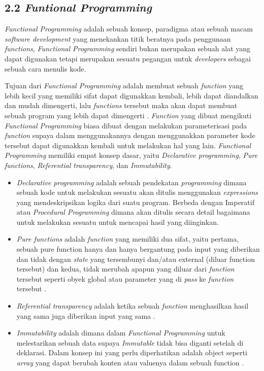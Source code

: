 \documentclass[a4paper]{article}
\begin{document}
    
\newpage
\subsection*{2.2 \textit{Funtional Programming}}
\textit{Functional Programming} adalah sebuah konsep, paradigma atau sebuah macam \textit{software development} yang menekankan titik beratnya pada penggunaan \textit{functions}, \textit{Functional Programming} sendiri bukan merupakan sebuah alat yang dapat digunakan tetapi merupakan sesuatu pegangan untuk \textit{developers} sebagai sebuah cara menulis kode\autocite{atencio2016functional}.


Tujuan dari \textit{Functional Programming} adalah membuat sebuah \textit{function} yang lebih kecil yang memiliki sifat dapat digunakkan kembali, lebih dapat diandalkan dan mudah dimengerti, lalu \textit{functions} tersebut maka akan dapat membuat sebuah program yang lebih dapat dimengerti \autocite{atencio2016functional}. \textit{Function} yang dibuat mengikuti \textit{Functional Programming} biasa dibuat dengan melakukan parameterisasi pada \textit{function} supaya dalam menggunakannya dengan menggunakkan parameter kode tersebut dapat digunakkan kembali untuk melakukan hal yang lain. \textit{Functional Programming} memiliki empat konsep dasar, yaitu \textit{Declarative programming}, \textit{Pure functions}, \textit{Referential transparency}, dan \textit{Immutability}\autocite{atencio2016functional}.


\begin{itemize}
    \item \textit{Declarative programming} adalah sebuah pendekatan \textit{programming} dimana sebuah kode untuk melakukan sesuatu akan ditulis menggunakan \textit{expressions} yang mendeskripsikan logika dari suatu program. Berbeda dengan Imperatif atau \textit{Procedural Programming} dimana akan ditulis secara detail bagaimana untuk melakukan sesuatu untuk mencapai hasil yang diinginkan\autocite{atencio2016functional}. 
    \item \textit{Pure functions} adalah \textit{function} yang memiliki dua sifat, yaitu pertama, sebuah pure function hanya dan hanya bergantung pada input yang diberikan dan tidak dengan \textit{state} yang tersembunyi dan/atau external (diluar function tersebut) dan kedua, tidak merubah apapun yang diluar dari \textit{function} tersebut seperti obyek global atau parameter yang di \textit{pass} ke \textit{function} tersebut \autocite{atencio2016functional}. 
    \item \textit{Referential transparency} adalah ketika sebuah \textit{function} menghasilkan hasil yang sama juga diberikan input yang sama \autocite{atencio2016functional}.
    \item \textit{Immutability} adalah dimana dalam \textit{Functional Programming} untuk melestarikan sebuah data supaya \textit{Immutable} tidak bisa diganti setelah di deklarasi. Dalam konsep ini yang perlu diperhatikan adalah object seperti \textit{array} yang dapat berubah konten atau valuenya dalam sebuah function \autocite{atencio2016functional}.  
\end{itemize}
\end{document}
